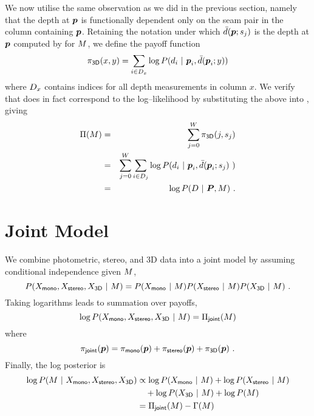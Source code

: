 We now utilise the same observation as we did in the previous section,
namely that the depth at $\Pixel$ is functionally dependent only on
the seam pair in the column containing $\Pixel$. Retaining the
notation under which $\ComputedDepth(\Pixel;\seam_j)$ is the depth at
$\Pixel$ computed by  for $\Scene$, we
define the payoff function
\begin{equation}
  \label{eq:depth-payoffs}
  \DepthPayoff(x,y) = 
  \sum_{i\in\Depths_x} \log P(\Depth_i~|~\Pixel_i,\ComputedDepth(\Pixel_i;y))
\end{equation}
where $\Depths_x$ contains indices for all depth measurements in
column $x$. We verify that  does in fact
correspond to the log--likelihood  by
substituting the above into , giving
\begin{eqnarray}
  \ScenePayoff(\Scene) &=& 
    \sum_{j=0}^W \DepthPayoff(j,\seam_j)\\
  &=&
    \sum_{j=0}^W \sum_{i\in\Depths_j} 
    \log P(\Depth_i~|~\Pixel_i,\ComputedDepth(\Pixel_i;\seam_j)~)\\
  &=&
    \log P(\Depths ~|~ \Pixels, \Scene)~.
\end{eqnarray}

\section{Joint Model}
We combine photometric, stereo, and 3D data into a joint model by
assuming conditional independence given $\Scene$,
\begin{equation}
  P(\Observations_{\textsf{mono}}, \Observations_{\textsf{stereo}}, \Observations_{\textsf{3D}} ~|~ \Scene)
  =
    P(\Observations_{\textsf{mono}} ~|~ \Scene)
    P(\Observations_{\textsf{stereo}} ~|~ \Scene)
    P(\Observations_{\textsf{3D}} ~|~ \Scene) ~.
  \label{eq:full-posterior}
\end{equation}
Taking logarithms leads to summation over payoffs,
\begin{equation}
  \log P(\Observations_{\textsf{mono}}, \Observations_{\textsf{stereo}}, \Observations_{\textsf{3D}} ~|~ \Scene)
  = \ScenePayoff_{\textsf{joint}}(\Scene)
\end{equation}
where
\begin{equation}
  \JointPayoff(\Pixel) =
  \MonoPayoff(\Pixel) + 
  \StereoPayoff(\Pixel) +
  \DepthPayoff(\Pixel) ~.
\end{equation}
Finally, the log posterior is
\begin{equation}
\begin{split}
  \log P(\Scene ~|~ \Observations_{\textsf{mono}}, \Observations_{\textsf{stereo}}, \Observations_{\textsf{3D}})
  & \propto
    \log P(\Observations_{\textsf{mono}} ~|~ \Scene)
    +\log P(\Observations_{\textsf{stereo}} ~|~ \Scene) \\
  & \quad + \log P(\Observations_{\textsf{3D}} ~|~ \Scene) + \log P(\Scene)\\
  & = \ScenePayoff_{\textsf{joint}}(\Scene) - \ScenePenalty(\Scene)
\end{split}
\end{equation}

